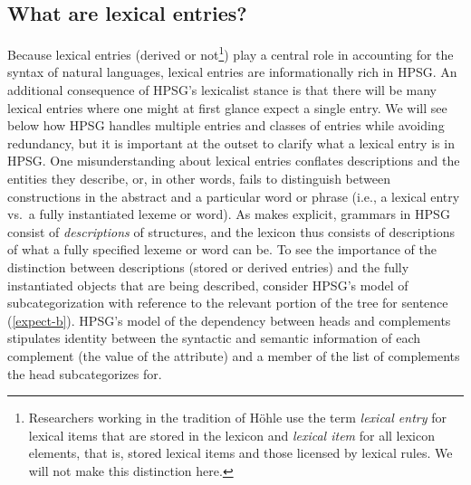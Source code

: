\documentclass[output=paper,biblatex,babelshorthands,newtxmath,draftmode,colorlinks,citecolor=brown]{langscibook}
\begin{document}
\subsection{What are lexical entries?}


Because lexical entries (derived or not\footnote{%
Researchers working in the tradition of Höhle use the term \emph{lexical entry} for lexical items that are stored in the lexicon and \emph{lexical item} for all lexicon elements, that is, stored lexical items and those licensed by lexical rules. We will not make this distinction here.}) play a central role in accounting for the syntax of natural languages, lexical entries are informationally rich in HPSG. 
An additional consequence of HPSG's lexicalist stance is that there will be many lexical entries where one might at first glance expect a single entry. We will see below how HPSG handles multiple entries and classes of entries while avoiding redundancy, but it is important at the outset to clarify what a lexical entry is in HPSG. 
One misunderstanding about lexical entries conflates descriptions and the entities they describe, or, in other words, fails to distinguish between constructions in the abstract and a particular word or phrase (i.e., a lexical entry vs.\ a fully instantiated lexeme or word). 
As  makes explicit, grammars in HPSG consist of \emph{descriptions} of structures, and the lexicon thus consists of descriptions of what a fully specified lexeme or word can be. 
To see the importance of the distinction between descriptions (stored or derived entries) and the fully instantiated objects that are being described, consider HPSG's model of subcategorization with reference to the relevant portion of the tree for sentence (\ref{expect-b}). 
HPSG's model of the dependency between heads and complements stipulates identity between the syntactic and semantic information of each complement (the value of the  attribute) and a member of the list of complements the head subcategorizes for. 
\end{document}
